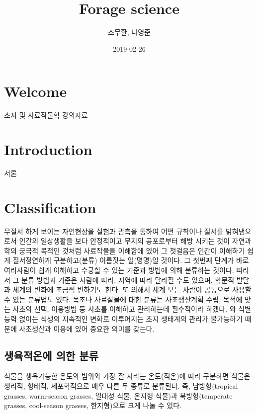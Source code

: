 \documentclass[]{book}
\title{Forage science}
\author{조무환, 나영준}
\date{2019-02-26}
\begin{document}
\maketitle

{
\setcounter{tocdepth}{1}
\tableofcontents
}
\chapter*{Welcome}\label{welcome}

초지 및 사료작물학 강의자료

\chapter{Introduction}\label{intro}

서론

\chapter{Classification}\label{classification}

무질서 하게 보이는 자연현상을 실험과 관측을 통하여 어떤 규칙이나 질서를
밝혀냄으로서 인간의 일상생활을 보다 안정적이고 무지의 공포로부터 해방
시키는 것이 자연과학의 궁극적 목적인 것처럼 사료작물을 이해함에 있어 그
첫걸음은 인간이 이해하기 쉽게 질서정연하게 구분하고(분류) 이름짓는
일(명명)일 것이다. 그 첫번째 단계가 바로 여러사람이 쉽게 이해하고 수긍할
수 있는 기준과 방법에 의해 분류하는 것이다. 따라서 그 분류 방법과 기준은
사람에 따라, 지역에 따라 달라질 수도 있으며, 학문적 발달과 체계의 변화에
조금씩 변하기도 한다. 또 의해서 세계 모든 사람이 공통으로 사용할 수 있는
분류법도 있다. 목초나 사료잘물에 대한 분류는 사초생산계획 수립, 목적에
맞는 사초의 선택, 이용방법 등 사초를 이해하고 관리하는데 필수적이라
하겠다. 와 식별능력 없이는 식생의 지속적인 변화로 이루어지는 초지
생태계의 관리가 불가능하기 때문에 사초생산과 이용에 있어 중요한 의미를
갖는다.

\section{생육적온에 의한 분류}\label{--}

식물을 생육가능한 온도의 범위와 가장 잘 자라는 온도(적온)에 따라
구분하면 식물은 생리적, 형태적, 세포학적으로 매우 다른 두 종류로
분류된다. 즉, 남방형(tropical grasses, warm-season grasses, 열대성 식물,
온지형 식물)과 북방형(temperate grasses, cool-season grasses,
한지형)으로 크게 나눌 수 있다.
\end{document}
